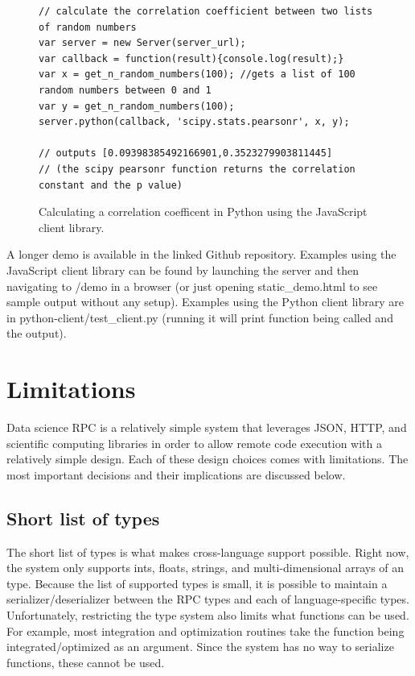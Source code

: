 \documentclass[11pt]{article}
\begin{document}
\begin{figure}[!ht]
  \centering
\lstset{language=Java}
\begin{lstlisting}
// calculate the correlation coefficient between two lists of random numbers
var server = new Server(server_url);
var callback = function(result){console.log(result);}
var x = get_n_random_numbers(100); //gets a list of 100 random numbers between 0 and 1
var y = get_n_random_numbers(100);
server.python(callback, 'scipy.stats.pearsonr', x, y);

// outputs [0.09398385492166901,0.3523279903811445]
// (the scipy pearsonr function returns the correlation constant and the p value)
\end{lstlisting}  \caption{Calculating a correlation coefficent in Python using the JavaScript client library. }
\end{figure}


A longer demo is available in the linked Github repository. Examples using the JavaScript client library can be found by launching the server and then navigating to /demo in a browser (or just opening static\_demo.html to see sample output without any setup). Examples using the Python client library are in python-client/test\_client.py (running it will print function being called and the output).

\section{Limitations}

Data science RPC is a relatively simple system that leverages JSON, HTTP, and scientific computing libraries in order to allow remote code execution with a relatively simple design. Each of these design choices comes with limitations. The most important decisions and their implications are discussed below.

\subsection{Short list of types}

The short list of types is what makes cross-language support possible. Right now, the system only supports ints, floats, strings, and multi-dimensional arrays of an type. Because the list of supported types is small, it is possible to maintain a serializer/deserializer between the RPC types and each of language-specific types. Unfortunately, restricting the type system also limits what functions can be used. For example, most integration and optimization routines take the function being integrated/optimized as an argument. Since the system has no way to serialize functions, these cannot be used. 
\end{document}
